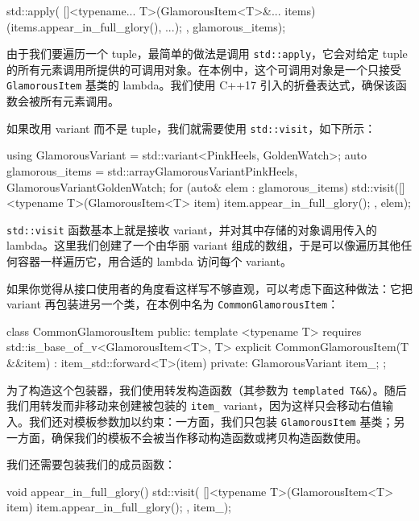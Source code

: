 \begin{codebox}[cpp]
std::apply(
    []<typename... T>(GlamorousItem<T>&... items) {
        (items.appear_in_full_glory(), ...);
    },
    glamorous_items);
\end{codebox}

\label{idx:553}
由于我们要遍历一个 tuple，最简单的做法是调用 \texttt{std::\allowbreak{}apply}，它会对给定 tuple 的所有元素调用所提供的可调用对象。在本例中，这个可调用对象是一个只接受 \texttt{Glamorous\allowbreak{}Item} 基类的 lambda。我们使用 C++17 引入的折叠表达式，确保该函数会被所有元素调用。

如果改用 variant 而不是 tuple，我们就需要使用 \texttt{std::\allowbreak{}visit}，如下所示：

\begin{codebox}[cpp]
using GlamorousVariant = std::variant<PinkHeels, GoldenWatch>;
auto glamorous_items = std::array{GlamorousVariant{PinkHeels{}}, GlamorousVariant{GoldenWatch{}}};
    for (auto& elem : glamorous_items) {
        std::visit([]<typename T>(GlamorousItem<T> item){ item.appear_in_full_glory();
    }, elem);
}
\end{codebox}

\texttt{std::\allowbreak{}visit} 函数基本上就是接收 variant，并对其中存储的对象调用传入的 lambda。这里我们创建了一个由华丽 variant 组成的数组，于是可以像遍历其他任何容器一样遍历它，用合适的 lambda 访问每个 variant。

如果你觉得从接口使用者的角度看这样写不够直观，可以考虑下面这种做法：它把 variant 再包装进另一个类，在本例中名为 \texttt{Common\allowbreak{}Glamorous\allowbreak{}Item}：

\begin{codebox}[cpp]
class CommonGlamorousItem {
public:
    template <typename T> requires std::is_base_of_v<GlamorousItem<T>, T>
    explicit CommonGlamorousItem(T &&item)
        : item_{std::forward<T>(item)} {}
private:
    GlamorousVariant item_;
};
\end{codebox}

\label{idx:554}
为了构造这个包装器，我们使用转发构造函数（其参数为 \texttt{templated T\&\&}）。随后我们用转发而非移动来创建被包装的 \texttt{item\_} variant，因为这样只会移动右值输入。我们还对模板参数加以约束：一方面，我们只包装 \texttt{Glamorous\allowbreak{}Item} 基类；另一方面，确保我们的模板不会被当作移动构造函数或拷贝构造函数使用。

我们还需要包装我们的成员函数：

\begin{codebox}[cpp]
void appear_in_full_glory() {
    std::visit(
        []<typename T>(GlamorousItem<T> item) {
            item.appear_in_full_glory(); },
        item_);
}
\end{codebox}

